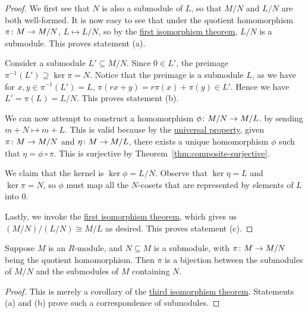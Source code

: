 \begin{proof}
    We first see that \(N\) is also a submodule of \(L\),
    so that \(M/N\) and \(L/N\) are both well-formed.
    It is now easy to see that under the quotient homomorphism \(\pi\colon M\to M/N\),
    \(L \mapsto L/N\),
    so by the \hyperref[thm:iso-1-mod]{first isomorphism theorem},
    \(L/N\) is a submodule.
    This proves statement (a).

    \medskip

    Consider a submodule \(L' \subseteq M/N\).
    Since \(0 \in L'\),
    the preimage \(\pi^{-1}(L') \supseteq \ker\pi = N\).
    Notice that the preimage is a submodule \(L\),
    as we have for \(x,y \in \pi^{-1}(L') = L\),
    \(\pi(rx+y) = r\pi(x) + \pi(y) \in L'\).
    Hence we have \(L' = \pi(L) = L/N\).
    This proves statement (b).

    \medskip

    We can now attempt to construct a homomorphism \(\phi\colon M/N\to M/L\).
    by sending \(m+N \mapsto m+L\).
    This is valid because by the \hyperref[thm:univ-prop-quotient-mod]{universal property},
    given \(\pi\colon M\to M/N\) and \(\eta\colon M\to M/L\),
    there exists a unique homomorphism \(\phi\)
    such that \(\eta = \phi\circ\pi\).
    This is surjective by Theorem~\ref{thm:composite-surjective}.

    We claim that the kernel is \(\ker\phi = L/N\).
    Observe that \(\ker\eta = L\) and \(\ker\pi = N\),
    so \(\phi\) must map all the \(N\)-cosets that are represented by elements of \(L\) into 0.

    Lastly, we invoke the \hyperref[thm:iso-1-mod]{first isomorphism theorem},
    which gives us \((M/N)/(L/N) \cong M/L\) as desired.
    This proves statement (c).
\end{proof}

\begin{theorem}\label{thm:iso-4-mod}
    Suppose \(M\) is an \(R\)-module,
    and \(N \subseteq M\) is a submodule,
    with \(\pi\colon M\to M/N\) being the quotient homomorphism.
    Then \(\pi\) is a bijection between the submodules of \(M/N\)
    and the submodules of \(M\) containing \(N\).
\end{theorem}
\begin{proof}
    This is merely a corollary of the \hyperref[thm:iso-3-mod]{third isomorphism theorem}.
    Statements (a) and (b) prove such a correspondence of submodules.
\end{proof}


